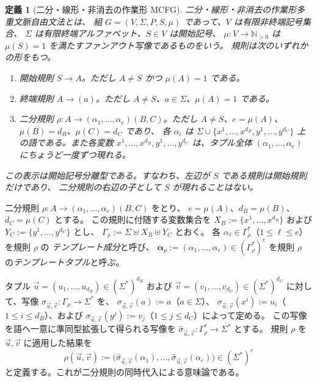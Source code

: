 \documentclass[11pt,a4paper]{ltjsarticle}
\newtheorem{definition}[theorem]{定義}
\theoremstyle{remark}
\newcommand{\tuple}[1]{\vec{#1}}
\begin{document}
\begin{definition}[二分・線形・非消去の作業形 MCFG]
\label{def:working-mcfg}
\emph{二分・線形・非消去の作業形多重文脈自由文法}とは、
組 \(G=(V,\Sigma,P,S,\mu)\) であって、\(V\) は有限非終端記号集合、
\(\Sigma\) は有限終端アルファベット、\(S\in V\) は開始記号、
\(\mu\colon V\to\mathbb N_{>0}\) は \(\mu(S)=1\) を満たすファンアウト写像であるものをいう。
規則は次のいずれかの形をもつ。
\begin{enumerate}[label=(\roman*),leftmargin=*]
\item 開始規則 \(S\to A\)。ただし \(A\ne S\) かつ \(\mu(A)=1\) である。
\item 終端規則 \(A\to(a)\)。ただし \(A\ne S\)、\(a\in\Sigma\)、\(\mu(A)=1\) である。
\item 二分規則 \(\rho\colon A\to(\alpha_1,\ldots,\alpha_e)(B,C)\)。ただし
      \(A\ne S\)、\(e=\mu(A)\)、\(\mu(B)=d_B\)、\(\mu(C)=d_C\) であり、
      各 \(\alpha_i\) は
      \(\Sigma\cup\{x^1,\ldots,x^{d_B},y^1,\ldots,y^{d_C}\}\)
      上の語である。また各変数
      \(x^1,\ldots,x^{d_B},y^1,\ldots,y^{d_C}\) は、タプル全体
      \((\alpha_1,\ldots,\alpha_e)\) にちょうど一度ずつ現れる。
\end{enumerate}
この表示は\emph{開始記号分離型}である。すなわち、左辺が \(S\) である規則は開始規則だけであり、
二分規則の右辺の子として \(S\) が現れることはない。
\end{definition}

二分規則 \(\rho\colon A\to(\alpha_1,\ldots,\alpha_e)(B,C)\) をとり、
\(e=\mu(A)\)、\(d_B=\mu(B)\)、\(d_C=\mu(C)\) とする。
この規則に付随する変数集合を
\(X_B:=\{x^1,\ldots,x^{d_B}\}\) および
\(Y_C:=\{y^1,\ldots,y^{d_C}\}\) とし、
\(\Gamma_\rho:=\Sigma\uplus X_B\uplus Y_C\) とおく。
各 \(\alpha_\ell\in\Gamma_\rho^*\)（\(1\le \ell\le e\)）を規則 \(\rho\) の
\emph{テンプレート成分}と呼び、
\(\boldsymbol{\alpha}_\rho:=(\alpha_1,\ldots,\alpha_e)\in(\Gamma_\rho^*)^e\)
を規則 \(\rho\) の\emph{テンプレートタプル}と呼ぶ。

タプル
\(\tuple u=(u_1,\ldots,u_{d_B})\in(\Sigma^*)^{d_B}\) および
\(\tuple v=(v_1,\ldots,v_{d_C})\in(\Sigma^*)^{d_C}\) に対して、写像
\(\sigma_{\tuple u,\tuple v}\colon\Gamma_\rho\to\Sigma^*\) を、
\(\sigma_{\tuple u,\tuple v}(a):=a\)（\(a\in\Sigma\)）、
\(\sigma_{\tuple u,\tuple v}(x^i):=u_i\)（\(1\le i\le d_B\)）、および
\(\sigma_{\tuple u,\tuple v}(y^j):=v_j\)（\(1\le j\le d_C\)）によって定める。
この写像を語へ一意に準同型拡張して得られる写像を
\(\widehat{\sigma}_{\tuple u,\tuple v}\colon\Gamma_\rho^*\to\Sigma^*\) とする。
規則 \(\rho\) を \(\tuple u,\tuple v\) に適用した結果を
\[
  \rho(\tuple u,\tuple v)
  :=
  \bigl(
    \widehat{\sigma}_{\tuple u,\tuple v}(\alpha_1),
    \ldots,
    \widehat{\sigma}_{\tuple u,\tuple v}(\alpha_e)
  \bigr)
  \in(\Sigma^*)^e
\]
と定義する。これが二分規則の同時代入による意味論である。
\end{document}
